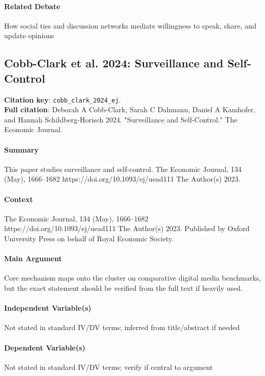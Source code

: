 \documentclass[12pt]{article}
\begin{document}
\paragraph{Related Debate} How social ties and discussion networks mediate willingness to speak, share, and update opinions


\subsection{Cobb-Clark et al. 2024: Surveillance and Self-Control}
\textbf{Citation key}: \texttt{cobb\_clark\_2024\_ej}.\\
\textbf{Full citation}: Deborah A Cobb-Clark, Sarah C Dahmann, Daniel A Kamhofer, and Hannah Schildberg-Horisch 2024. "Surveillance and Self-Control." The Economic Journal.

\paragraph{Summary} This paper studies surveillance and self-control. The Economic Journal, 134 (May), 1666--1682 https://doi.org/10.1093/ej/uead111  The Author(s) 2023.

\paragraph{Context} The Economic Journal, 134 (May), 1666--1682 https://doi.org/10.1093/ej/uead111  The Author(s) 2023. Published by Oxford University Press on behalf of Royal Economic Society.

\paragraph{Main Argument} Core mechanism maps onto the cluster on comparative digital media benchmarks, but the exact statement should be verified from the full text if heavily used.

\paragraph{Independent Variable(s)} Not stated in standard IV/DV terms; inferred from title/abstract if needed

\paragraph{Dependent Variable(s)} Not stated in standard IV/DV terms; verify if central to argument
\end{document}

